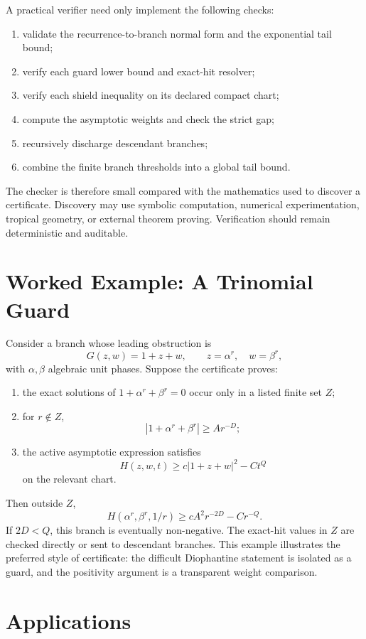 \documentclass[11pt]{article}
\begin{document}
A practical verifier need only implement the following checks:
\begin{enumerate}[label=(\arabic*)]
\item validate the recurrence-to-branch normal form and the exponential tail bound;
\item verify each guard lower bound and exact-hit resolver;
\item verify each shield inequality on its declared compact chart;
\item compute the asymptotic weights and check the strict gap;
\item recursively discharge descendant branches;
\item combine the finite branch thresholds into a global tail bound.
\end{enumerate}

The checker is therefore small compared with the mathematics used to discover a certificate. Discovery may use symbolic computation, numerical experimentation, tropical geometry, or external theorem proving. Verification should remain deterministic and auditable.

\section{Worked Example: A Trinomial Guard}

Consider a branch whose leading obstruction is
\[
G(z,w)=1+z+w,
\qquad
z=\alpha^r,\quad w=\beta^r,
\]
with \(\alpha,\beta\) algebraic unit phases. Suppose the certificate proves:
\begin{enumerate}[label=(\roman*)]
\item the exact solutions of \(1+\alpha^r+\beta^r=0\) occur only in a listed finite set \(Z\);
\item for \(r\notin Z\),
\[
|1+\alpha^r+\beta^r|\ge A r^{-D};
\]
\item the active asymptotic expression satisfies
\[
H(z,w,t)\ge c|1+z+w|^2-Ct^Q
\]
on the relevant chart.
\end{enumerate}
Then outside \(Z\),
\[
H(\alpha^r,\beta^r,1/r)
\ge
cA^2r^{-2D}-Cr^{-Q}.
\]
If \(2D<Q\), this branch is eventually non-negative. The exact-hit values in \(Z\) are checked directly or sent to descendant branches. This example illustrates the preferred style of certificate: the difficult Diophantine statement is isolated as a guard, and the positivity argument is a transparent weight comparison.

\section{Applications}
\end{document}

